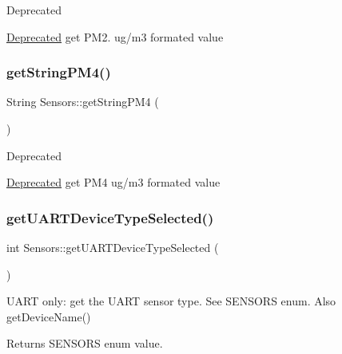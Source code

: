 \begin{DoxyRefDesc}{Deprecated}
\item[\hyperlink{deprecated__deprecated000002}{Deprecated}]get P\+M2. ug/m3 formated value \end{DoxyRefDesc}
\mbox{\label{classSensors_ab4eb2c9e8cd83823dfedb2c72aa2b405}} 
\subsubsection{\texorpdfstring{get\+String\+P\+M4()}{getStringPM4()}}
{\footnotesize\ttfamily String Sensors\+::get\+String\+P\+M4 (\begin{DoxyParamCaption}{ }\end{DoxyParamCaption})}

\begin{DoxyRefDesc}{Deprecated}
\item[\hyperlink{deprecated__deprecated000003}{Deprecated}]get P\+M4 ug/m3 formated value \end{DoxyRefDesc}
\mbox{\label{classSensors_aaca8ec4ae2c64c366c33622d3332ffb1}} 
\subsubsection{\texorpdfstring{get\+U\+A\+R\+T\+Device\+Type\+Selected()}{getUARTDeviceTypeSelected()}}
{\footnotesize\ttfamily int Sensors\+::get\+U\+A\+R\+T\+Device\+Type\+Selected (\begin{DoxyParamCaption}{ }\end{DoxyParamCaption})}



U\+A\+RT only\+: get the U\+A\+RT sensor type. See S\+E\+N\+S\+O\+RS enum. Also get\+Device\+Name() 

\begin{DoxyReturn}{Returns}
S\+E\+N\+S\+O\+RS enum value. 
\end{DoxyReturn}
\mbox{\label{classSensors_a4abb5d2a00d31a407e32cbdabe00b6eb}} 
